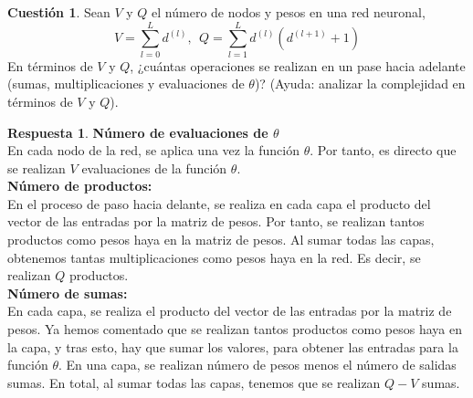 \documentclass[10pt,a4paper]{article}
\theoremstyle{definition}
\newtheorem{cuestion}{Cuestión}
\newtheorem*{respuesta}{Respuesta}
\begin{document}
\begin{cuestion}
Sean $V$ y $Q$ el número de nodos y pesos en una red neuronal,
\[ V = \sum_{l=0}^L d^{(l)},\ \ Q = \sum_{l=1}^L d^{(l)} (d^{(l+1)}+1)	\]
En términos de $V$ y $Q$, ¿cuántas operaciones se realizan en un pase hacia adelante (sumas, multiplicaciones y evaluaciones de $\theta$)? (Ayuda: analizar la complejidad en términos de $V$ y $Q$).\\
\end{cuestion}
\begin{respuesta}

\textbf{Número de evaluaciones de $\theta$}\\
En cada nodo de la red, se aplica una vez la función $\theta$. Por tanto, es directo que se realizan $V$ evaluaciones de la función $\theta$.\\

\textbf{Número de productos:}\\
En el proceso de paso hacia delante, se realiza en cada capa el producto del vector de las entradas por la matriz de pesos. Por tanto, se realizan tantos productos como pesos haya en la matriz de pesos. Al sumar todas las capas, obtenemos tantas multiplicaciones como pesos haya en la red. Es decir, se realizan $Q$ productos.\\

\textbf{Número de sumas:}\\
En cada capa, se realiza el producto del vector de las entradas por la matriz de pesos. Ya hemos comentado que se realizan tantos productos como pesos haya en la capa, y tras esto, hay que sumar los valores, para obtener las entradas para la función $\theta$. En una capa, se realizan número de pesos menos el número de salidas sumas. En total, al sumar todas las capas, tenemos que se realizan $Q-V$ sumas.\\


\end{respuesta}
\end{document}
